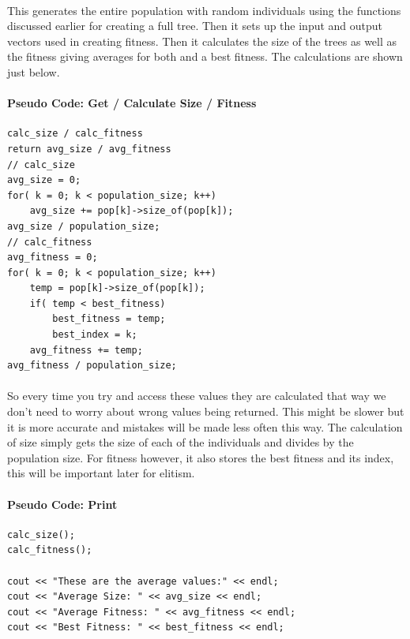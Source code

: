 \documentclass[paper=a4, fontsize=11pt]{scrartcl} %
\numberwithin{equation}{section} %
\numberwithin{figure}{section} %
\numberwithin{table}{section} %
\begin{document}
\paragraph{} This generates the entire population with random individuals using the functions discussed earlier for creating a full tree. Then it sets up the input and output vectors used in creating fitness. Then it calculates the size of the trees as well as the fitness giving averages for both and a best fitness. The calculations are shown just below.

\paragraph{Pseudo Code: Get / Calculate Size / Fitness}
\begin{verbatim}
calc_size / calc_fitness
return avg_size / avg_fitness
// calc_size
avg_size = 0;
for( k = 0; k < population_size; k++)
    avg_size += pop[k]->size_of(pop[k]);
avg_size / population_size;
// calc_fitness
avg_fitness = 0;
for( k = 0; k < population_size; k++)
    temp = pop[k]->size_of(pop[k]);
    if( temp < best_fitness)
        best_fitness = temp;
        best_index = k;
    avg_fitness += temp;
avg_fitness / population_size;
\end{verbatim}

\paragraph{} So every time you try and access these values they are calculated that way we don't need to worry about wrong values being returned. This might be slower but it is more accurate and mistakes will be made less often this way. The calculation of size simply gets the size of each of the individuals and divides by the population size. For fitness however, it also stores the best fitness and its index, this will be important later for elitism.

\paragraph{Pseudo Code: Print}
\begin{verbatim}
calc_size();
calc_fitness();

cout << "These are the average values:" << endl;
cout << "Average Size: " << avg_size << endl;
cout << "Average Fitness: " << avg_fitness << endl;
cout << "Best Fitness: " << best_fitness << endl;
\end{verbatim}
\end{document}

